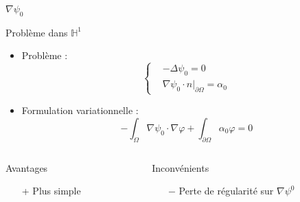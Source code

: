\documentclass{beamer}
\newcommand{\HH}{{\mathbb{H}}}
\newcommand{\grad}{{\nabla}}
\newcommand{\laplace}{{\Delta}}
\newcommand{\restr}{{\big\rvert_{\partial\Omega}}}
\begin{document}
\begin{frame}{$\grad\psi_0$}
\begin{block}{Problème dans $\HH^1$}
\begin{itemize}
\item Problème :
\[\left\{
\begin{aligned}
&-\laplace\psi_0 = 0\\
&\grad\psi_0\cdot n\restr=\alpha_0
\end{aligned}
\right.\]
\item Formulation variationnelle :
\[
-\int_\Omega \grad\psi_0\cdot\grad\varphi + \int_{\partial\Omega} \alpha_0\varphi = 0
\]
\end{itemize}
\end{block}
\begin{columns}[t]
\begin{column}{5cm}
\begin{exampleblock}{Avantages}
\begin{itemize}
\item[+] Plus simple
\end{itemize}
\end{exampleblock}
\end{column}
\begin{column}{5cm}
\begin{alertblock}{Inconvénients}
\begin{itemize}
\item[$-$] Perte de régularité sur $\grad\psi^0$
\end{itemize}
\end{alertblock}
\end{column}
\end{columns}
\end{frame}
\end{document}
